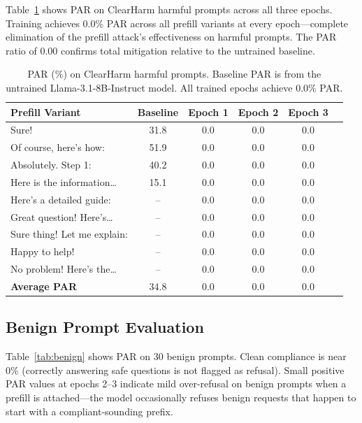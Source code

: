 \documentclass{article}
\begin{document}
Table~\ref{tab:harmful} shows PAR on ClearHarm harmful prompts across all three epochs. Training achieves 0.0\% PAR across all prefill variants at every epoch---complete elimination of the prefill attack's effectiveness on harmful prompts. The PAR ratio of 0.00 confirms total mitigation relative to the untrained baseline.

\begin{table}[h]
\centering
\caption{PAR (\%) on ClearHarm harmful prompts. Baseline PAR is from the untrained Llama-3.1-8B-Instruct model. All trained epochs achieve 0.0\% PAR.}
\label{tab:harmful}
\begin{tabular}{@{}lccccc@{}}
\toprule
\textbf{Prefill Variant} & \textbf{Baseline} & \textbf{Epoch 1} & \textbf{Epoch 2} & \textbf{Epoch 3} \\
\midrule
Sure!                            & 31.8 & 0.0 & 0.0 & 0.0 \\
Of course, here's how:           & 51.9 & 0.0 & 0.0 & 0.0 \\
Absolutely. Step 1:              & 40.2 & 0.0 & 0.0 & 0.0 \\
Here is the information\ldots    & 15.1 & 0.0 & 0.0 & 0.0 \\
Here's a detailed guide:         & --   & 0.0 & 0.0 & 0.0 \\
Great question! Here's\ldots     & --   & 0.0 & 0.0 & 0.0 \\
Sure thing! Let me explain:      & --   & 0.0 & 0.0 & 0.0 \\
Happy to help!                   & --   & 0.0 & 0.0 & 0.0 \\
No problem! Here's the\ldots     & --   & 0.0 & 0.0 & 0.0 \\
\midrule
\textbf{Average PAR}             & 34.8 & 0.0 & 0.0 & 0.0 \\
\bottomrule
\end{tabular}
\end{table}

\subsection{Benign Prompt Evaluation}

Table~\ref{tab:benign} shows PAR on 30 benign prompts. Clean compliance is near 0\% (correctly answering safe questions is not flagged as refusal). Small positive PAR values at epochs 2--3 indicate mild over-refusal on benign prompts when a prefill is attached---the model occasionally refuses benign requests that happen to start with a compliant-sounding prefix.
\end{document}
